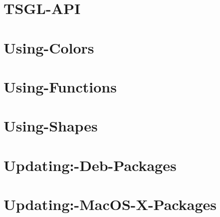 \documentclass[twoside]{book}
\begin{document}
\chapter{T\-S\-G\-L-\/\-A\-P\-I}
\label{md__home_kodemonkey_workspace__t_s_g_l_docs-wiki__t_s_g_l-_a_p_i}
\hypertarget{md__home_kodemonkey_workspace__t_s_g_l_docs-wiki__t_s_g_l-_a_p_i}{}

\chapter{Using-\/\-Colors}
\label{md__home_kodemonkey_workspace__t_s_g_l_docs-wiki_tutorials__using-_colors}
\hypertarget{md__home_kodemonkey_workspace__t_s_g_l_docs-wiki_tutorials__using-_colors}{}

\chapter{Using-\/\-Functions}
\label{md__home_kodemonkey_workspace__t_s_g_l_docs-wiki_tutorials__using-_functions}
\hypertarget{md__home_kodemonkey_workspace__t_s_g_l_docs-wiki_tutorials__using-_functions}{}

\chapter{Using-\/\-Shapes}
\label{md__home_kodemonkey_workspace__t_s_g_l_docs-wiki_tutorials__using-_shapes}
\hypertarget{md__home_kodemonkey_workspace__t_s_g_l_docs-wiki_tutorials__using-_shapes}{}

\chapter{Updating\-:-\/\-Deb-\/\-Packages}
\label{md__home_kodemonkey_workspace__t_s_g_l_docs-wiki__updating_1-_deb-_packages}
\hypertarget{md__home_kodemonkey_workspace__t_s_g_l_docs-wiki__updating_1-_deb-_packages}{}

\chapter{Updating\-:-\/\-Mac\-O\-S-\/\-X-\/\-Packages}
\label{md__home_kodemonkey_workspace__t_s_g_l_docs-wiki__updating_1-_mac_o_s-_x-_packages}
\hypertarget{md__home_kodemonkey_workspace__t_s_g_l_docs-wiki__updating_1-_mac_o_s-_x-_packages}{}

\end{document}
